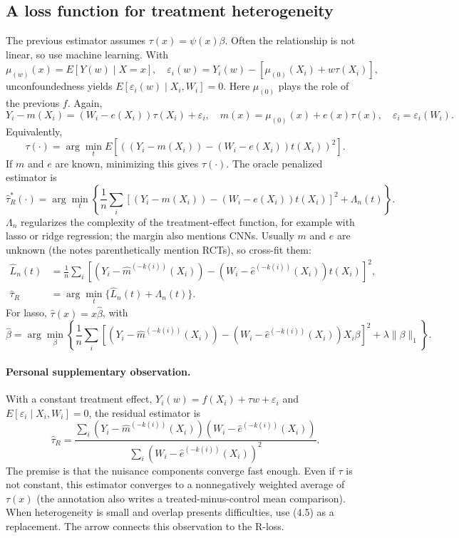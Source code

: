 \subsection{A loss function for treatment heterogeneity}
The previous estimator assumes $\tau(x)=\psi(x)\beta$. Often the relationship is not linear, so use machine learning. With
\[
\mu_{(w)}(x)=E[Y(w)\mid X=x],\quad
\varepsilon_i(w)=Y_i(w)-[\mu_{(0)}(X_i)+w\tau(X_i)],
\]
unconfoundedness yields $E[\varepsilon_i(w)\mid X_i,W_i]=0$. Here $\mu_{(0)}$ plays the role of the previous $f$. Again,
\[
Y_i-m(X_i)=(W_i-e(X_i))\tau(X_i)+\varepsilon_i,
\quad m(x)=\mu_{(0)}(x)+e(x)\tau(x),\quad \varepsilon_i=\varepsilon_i(W_i).
\]
Equivalently,
\[
\tau(\cdot)=\arg\min_{t}E[((Y_i-m(X_i))-(W_i-e(X_i))t(X_i))^2].
\]
If $m$ and $e$ are known, minimizing this gives $\tau(\cdot)$. The oracle penalized estimator is
\[
\widehat\tau_R^*(\cdot)=\arg\min_t\left\{
\frac1n\sum_i[(Y_i-m(X_i))-(W_i-e(X_i))t(X_i)]^2+\Lambda_n(t)\right\}.
\]
$\Lambda_n$ regularizes the complexity of the treatment-effect function, for example with lasso or ridge regression; the margin also mentions CNNs. Usually $m$ and $e$ are unknown (the notes parenthetically mention RCTs), so cross-fit them:
\begin{align*}
\widehat L_n(t)&=\frac1n\sum_i
[(Y_i-\widehat m^{(-k(i))}(X_i))-(W_i-\widehat e^{(-k(i))}(X_i))t(X_i)]^2,\\
\widehat\tau_R&=\arg\min_t\{\widehat L_n(t)+\Lambda_n(t)\}.
\end{align*}
For lasso, $\widehat\tau(x)=x\widehat\beta$, with
\[
\widehat\beta=\arg\min_\beta\left\{\frac1n\sum_i
[(Y_i-\widehat m^{(-k(i))}(X_i))-(W_i-\widehat e^{(-k(i))}(X_i))X_i\beta]^2
+\lambda\|\beta\|_1\right\}.
\]
\paragraph{Personal supplementary observation.}
With a constant treatment effect,
$Y_i(w)=f(X_i)+\tau w+\varepsilon_i$ and $E[\varepsilon_i\mid X_i,W_i]=0$, the residual estimator is
\[
\widehat\tau_R=\frac{\sum_i(Y_i-\widehat m^{(-k(i))}(X_i))(W_i-\widehat e^{(-k(i))}(X_i))}
{\sum_i(W_i-\widehat e^{(-k(i))}(X_i))^2}.
\tag{4.5 in the notes}
\]
The premise is that the nuisance components converge fast enough. Even if $\tau$ is not constant, this estimator converges to a nonnegatively weighted average of $\tau(x)$ (the annotation also writes a treated-minus-control mean comparison). When heterogeneity is small and overlap presents difficulties, use (4.5) as a replacement. The arrow connects this observation to the R-loss.

